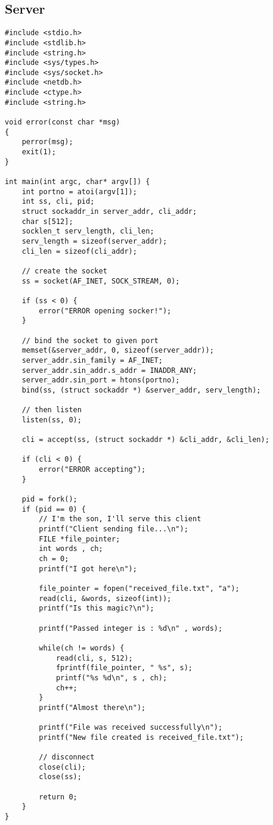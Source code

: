 \documentclass{article}
\begin{document}
\subsection{Server}
\begin{lstlisting}
#include <stdio.h>
#include <stdlib.h>
#include <string.h>
#include <sys/types.h>
#include <sys/socket.h>
#include <netdb.h>
#include <ctype.h>
#include <string.h>

void error(const char *msg)
{
    perror(msg);
    exit(1);
}

int main(int argc, char* argv[]) {
    int portno = atoi(argv[1]);
    int ss, cli, pid;
    struct sockaddr_in server_addr, cli_addr;
    char s[512];
    socklen_t serv_length, cli_len;
    serv_length = sizeof(server_addr);
    cli_len = sizeof(cli_addr);

    // create the socket
    ss = socket(AF_INET, SOCK_STREAM, 0);

    if (ss < 0) {
        error("ERROR opening socker!");
    }

    // bind the socket to given port
    memset(&server_addr, 0, sizeof(server_addr));
    server_addr.sin_family = AF_INET;
    server_addr.sin_addr.s_addr = INADDR_ANY;
    server_addr.sin_port = htons(portno);
    bind(ss, (struct sockaddr *) &server_addr, serv_length);

    // then listen
    listen(ss, 0);

    cli = accept(ss, (struct sockaddr *) &cli_addr, &cli_len);

    if (cli < 0) {
        error("ERROR accepting");
    }

    pid = fork();
    if (pid == 0) {
        // I'm the son, I'll serve this client
        printf("Client sending file...\n");
        FILE *file_pointer;
        int words , ch;
        ch = 0;
        printf("I got here\n");

        file_pointer = fopen("received_file.txt", "a");
        read(cli, &words, sizeof(int));
        printf("Is this magic?\n");

        printf("Passed integer is : %d\n" , words);

        while(ch != words) {
            read(cli, s, 512);
            fprintf(file_pointer, " %s", s);
            printf("%s %d\n", s , ch);
            ch++;
        }
        printf("Almost there\n");

        printf("File was received successfully\n");
        printf("New file created is received_file.txt");
    
        // disconnect
        close(cli);
        close(ss);
        
        return 0;
    }
}
\end{lstlisting}
\end{document}
